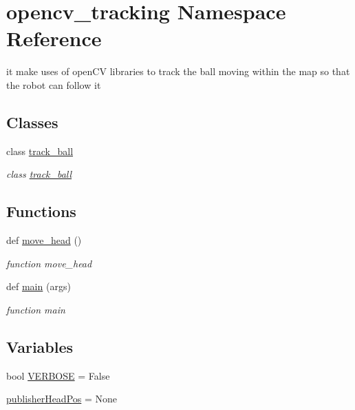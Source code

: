 \hypertarget{namespaceopencv__tracking}{}\section{opencv\+\_\+tracking Namespace Reference}
\label{namespaceopencv__tracking}


it make uses of open\+CV libraries to track the ball moving within the map so that the robot can follow it  


\subsection*{Classes}
\begin{DoxyCompactItemize}
\item 
class \hyperlink{classopencv__tracking_1_1track__ball}{track\+\_\+ball}
\begin{DoxyCompactList}\small\item\em class \hyperlink{classopencv__tracking_1_1track__ball}{track\+\_\+ball} \end{DoxyCompactList}\end{DoxyCompactItemize}
\subsection*{Functions}
\begin{DoxyCompactItemize}
\item 
def \hyperlink{namespaceopencv__tracking_a995cc557b9057da68d7854f109f65fba}{move\+\_\+head} ()
\begin{DoxyCompactList}\small\item\em function move\+\_\+head \end{DoxyCompactList}\item 
def \hyperlink{namespaceopencv__tracking_a5907a41ecff5bba825ea991875098ac4}{main} (args)
\begin{DoxyCompactList}\small\item\em function main \end{DoxyCompactList}\end{DoxyCompactItemize}
\subsection*{Variables}
\begin{DoxyCompactItemize}
\item 
bool \hyperlink{namespaceopencv__tracking_ad3cc02ced91fdb8fd9b8fb0a89e7c297}{V\+E\+R\+B\+O\+SE} = False
\item 
\hyperlink{namespaceopencv__tracking_a7202eae3d5ab37aa25a9fd11beb0f87e}{publisher\+Head\+Pos} = None
\end{DoxyCompactItemize}


